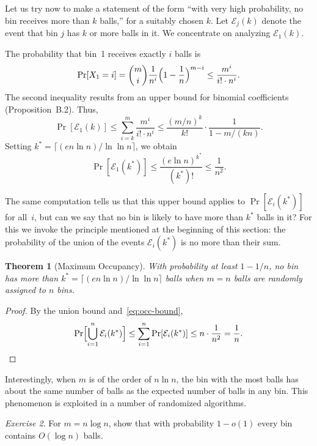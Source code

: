 \documentclass[twoside,12pt]{book}
\theoremstyle{plain}
\newtheorem{theorem}{Theorem}[chapter]
\theoremstyle{definition}
\theoremstyle{remark}
\newtheorem{exercise}[theorem]{Exercise}
\begin{document}
Let us try now to make a statement of the form ``with very high probability, no bin receives more than $k$ balls,'' for a suitably chosen $k$. Let $\mathcal{E}_j(k)$ denote the event that bin $j$ has $k$ or more balls in it. We concentrate on analyzing $\mathcal{E}_1(k)$.

The probability that bin~1 receives exactly $i$ balls is
\[
\Pr[X_1 = i] = \binom{m}{i} \frac{1}{n^i}\Bigl(1 - \frac{1}{n}\Bigr)^{m-i} \leq \frac{m^i}{i! \cdot n^i}.
\]
The second inequality results from an upper bound for binomial coefficients (Proposition~B.2). Thus,
\[
\Pr[\mathcal{E}_1(k)] \leq \sum_{i=k}^{m} \frac{m^i}{i! \cdot n^i} \leq \frac{(m/n)^k}{k!} \cdot \frac{1}{1 - m/(kn)}.
\]
Setting $k^* = \lceil (en \ln n) / \ln \ln n \rceil$, we obtain
\begin{equation}
\Pr[\mathcal{E}_1(k^*)] \leq \frac{(e \ln n)^{k^*}}{(k^*)!} \leq \frac{1}{n^2}.
\label{eq:occ-bound}
\end{equation}

The same computation tells us that this upper bound applies to $\Pr[\mathcal{E}_i(k^*)]$ for all~$i$, but can we say that no bin is likely to have more than $k^*$ balls in it? For this we invoke the principle mentioned at the beginning of this section: the probability of the union of the events $\mathcal{E}_i(k^*)$ is no more than their sum.

\begin{theorem}[Maximum Occupancy]
\label{thm:occ-max}
With probability at least $1 - 1/n$, no bin has more than $k^* = \lceil (en \ln n) / \ln \ln n \rceil$ balls when $m = n$ balls are randomly assigned to $n$ bins.
\end{theorem}

\begin{proof}
By the union bound and~\eqref{eq:occ-bound},
\[
\Pr\Bigl[\bigcup_{i=1}^{n} \mathcal{E}_i(k^*)\Bigr] \leq \sum_{i=1}^{n} \Pr[\mathcal{E}_i(k^*)] \leq n \cdot \frac{1}{n^2} = \frac{1}{n}.
\]
\end{proof}

\medskip

Interestingly, when $m$ is of the order of $n \ln n$, the bin with the most balls has about the same number of balls as the expected number of balls in any bin. This phenomenon is exploited in a number of randomized algorithms.

\begin{exercise}
For $m = n \log n$, show that with probability $1 - o(1)$ every bin contains $O(\log n)$ balls.
\end{exercise}
\end{document}
